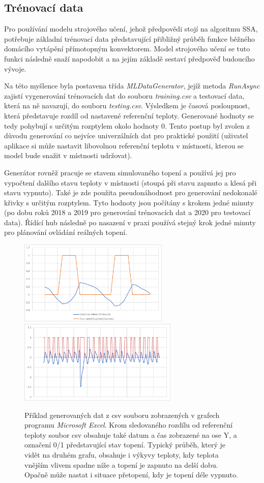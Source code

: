 \subsection{Trénovací data}
Pro používání modelu strojového učení, jehož předpovědi stojí na algoritmu SSA, potřebuje základní trénovací data představující přibližný průběh funkce běžného domácího vytápění přímotopným konvektorem. Model strojového učení se tuto funkci následně snaží napodobit a na jejím základě sestaví předpověď budoucího vývoje.

Na této myšlence byla postavena třída {\it MLDataGenerator}, jejíž metoda {\it RunAsync} zajistí vygenerování trénovacích dat do souboru {\it training.csv} a testovací data, která na ně navazují, do souboru {\it testing.csv}. Výsledkem je časová posloupnost, která představuje rozdíl od nastavené referenční teploty. Generované hodnoty se tedy pohybují s určitým rozptylem okolo hodnoty 0. Tento postup byl zvolen z důvodu generování co nejvíce univerzálních dat pro praktické použití (uživatel aplikace si může nastavit libovolnou referenční teplotu v místnosti, kterou se model bude snažit v místnosti udržovat).

Generátor rovněž pracuje se stavem simulovaného topení a používá jej pro vypočtení dalšího stavu teploty v místnosti (stoupá při stavu zapnuto a klesá při stavu vypnuto). Také je zde použita pseudonáhodnost pro generování nedokonalé křivky s určitým rozptylem. Tyto hodnoty jsou počítány s krokem jedné minuty (po dobu roků 2018 a 2019 pro generování trénovacích dat a 2020 pro testovací data). Řídící hub následně po nasazení v praxi používá stejný krok jedné minuty pro plánování ovládání reálných topení.

\begin{figure}[hbt]
\centering
\includegraphics[height=4cm]{obrazky-figures/mlgen_1.png}
\includegraphics[height=4cm]{obrazky-figures/mlgen_2.png}
\caption{Příklad generovaných dat z csv souboru zobrazených v grafech programu {\it Microsoft Excel}. Krom sledovaného rozdílu od referenční teploty soubor csv obsahuje také datum a čas zobrazené na ose Y, a označení 0/1 představující stav topení. Typický průběh, který je vidět na druhém grafu, obsahuje i výkyvy teploty, kdy teplota vnějším vlivem spadne níže a topení je zapnuto na delší dobu. Opačně může nastat i situace přetopení, kdy je topení déle vypnuto.}
\end{figure}

